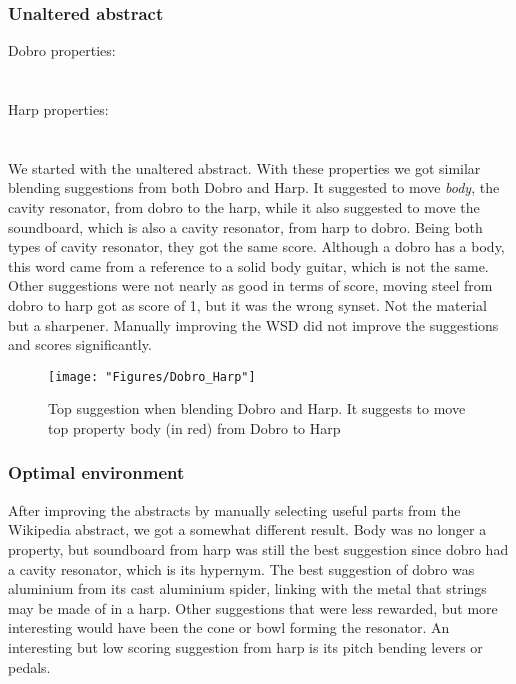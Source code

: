 \subsubsection{Unaltered abstract}

Dobro properties:\\
\noindent{}
\\\\Harp properties:\\
\noindent{}
\\\\We started with the unaltered abstract.
With these properties we got similar blending suggestions from both Dobro and Harp. It suggested to move \emph{body}, the cavity resonator, from dobro to the harp, while it also suggested to move the soundboard, which is also a cavity resonator, from harp to dobro. Being both types of cavity resonator, they got the same score. Although a dobro has a body, this word came from a reference to a solid body guitar, which is not the same. Other suggestions were not nearly as good in terms of score, moving steel from dobro to harp got as score of 1, but it was the wrong synset. Not the material but a sharpener. Manually improving the WSD did not improve the suggestions and scores significantly. 
		
\begin{figure} \centering \texttt{[image: "Figures/Dobro\_Harp"]} \caption{Top suggestion when blending Dobro and Harp. It suggests to move top property body (in red) from Dobro to Harp} \label{Dobro-Harp} \end{figure}

\subsubsection{Optimal environment}

After improving the abstracts by manually selecting useful parts from the Wikipedia abstract, we got a somewhat different result. Body was no longer a property, but soundboard from harp was still the best suggestion since dobro had a cavity resonator, which is its hypernym. The best suggestion of dobro was aluminium from its cast aluminium spider, linking with the metal that strings may be made of in a harp. Other suggestions that were less rewarded, but more interesting would have been the cone or bowl forming the resonator. An interesting but low scoring suggestion from harp is its pitch bending levers or pedals.


